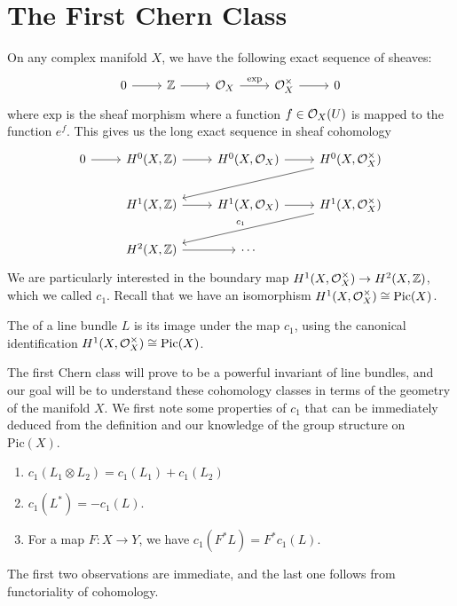 \section{The First Chern Class}
%
On any complex manifold $X$, we have the following exact sequence of sheaves:
\[\begin{tikzcd}
0 \ar[r] & \Z \ar[r] & \O_X \ar[r, "\mathrm{exp}"] & \O_X^\times \ar[r] & 0
\end{tikzcd}\]
where $\mathrm{exp}$ is the sheaf morphism where a function $f \in \mathcal{O}_X(U)$ is
mapped to the function $e^f$. This gives us the long exact sequence in sheaf
cohomology
\[\begin{tikzcd}
0 \ar[r] & H^0(X, \Z) \ar[r] & H^0(X, \O_X) \ar[r] & H^0(X, \O_X^\times) \ar[dll]\\
& H^1(X, \Z) \ar[r] & H^1(X, \O_X) \ar[r] & H^1(X, \O_X^\times) \ar[dll, "c_1"']\\
& H^2(X, \Z) \ar[r] & \cdots
\end{tikzcd}\]
%
We are particularly interested in the boundary map $H^1(X,\mathcal{O}_X^\times) \to H^2(X, \mathbb{Z})$,
which we called $c_1$. Recall that we have an isomorphism
$H^1(X,\mathcal{O}_X^\times) \cong \mathrm{Pic}(X)$.
%
\begin{defn}
The  of a line bundle $L$ is its image under the map
$c_1$, using the canonical identification $H^1(X,\mathcal{O}_X^\times) \cong \mathrm{Pic}(X)$.
\end{defn}
%
The first Chern class will prove to be a powerful invariant of line bundles, and
our goal will be to understand these cohomology classes in terms of the geometry
of the manifold $X$. We first note some properties of $c_1$ that can be immediately
deduced from the definition and our knowledge of the group structure on $\mathrm{Pic}(X)$.
%
\begin{prop} \enumbreak
\begin{enumerate}
  \item $c_1(L_1 \otimes L_2) = c_1(L_1) + c_1(L_2)$
  \item $c_1(L^*) = -c_1(L)$.
  \item For a map $F : X \to Y$, we have $c_1(F^*L) = F^*c_1(L)$.
\end{enumerate}
\end{prop}
The first two observations are immediate, and the last one follows from functoriality
of cohomology. \\

